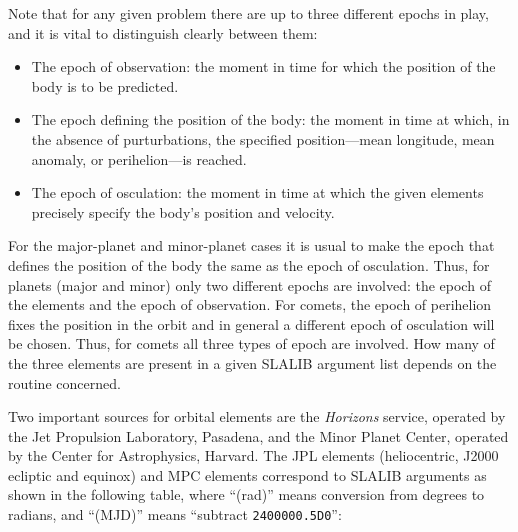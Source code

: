 \documentclass[11pt,twoside]{article}
\begin{document}
Note that for any given problem there are up to three different
epochs in play, and it is vital to distinguish clearly between
them:
\begin{itemize}
\item The epoch of observation:  the moment in time for which the
      position of the body is to be predicted.
\item The epoch defining the position of the body:  the moment in time
      at which, in the absence of purturbations, the specified
      position---mean longitude, mean anomaly, or perihelion---is
      reached.
\item The epoch of osculation:  the moment in time at which the given
      elements precisely specify the body's position and velocity.
\end{itemize}

For the major-planet and minor-planet cases it is usual to make
the epoch that defines the position of the body the same as the
epoch of osculation.  Thus, for planets (major and
minor) only two different epochs are
involved:  the epoch of the elements and the epoch of observation.
For comets, the epoch of perihelion fixes the position in the
orbit and in general a different epoch of osculation will be
chosen.  Thus, for comets all three types of epoch are involved.
How many of the three elements are present in a given SLALIB
argument list depends on the routine concerned.

Two important sources for orbital elements are the {\it Horizons}\/
service, operated by the Jet Propulsion Laboratory, Pasadena,
and the Minor Planet Center, operated by the Center for
Astrophysics, Harvard.
The JPL elements (heliocentric, J2000 ecliptic and
equinox) and MPC elements
correspond to SLALIB arguments as shown in the following table,
where ``(rad)'' means conversion from degrees to radians, and
``(MJD)'' means ``subtract {\tt 2400000.5D0}'':

\vspace{2ex}
\end{document}
